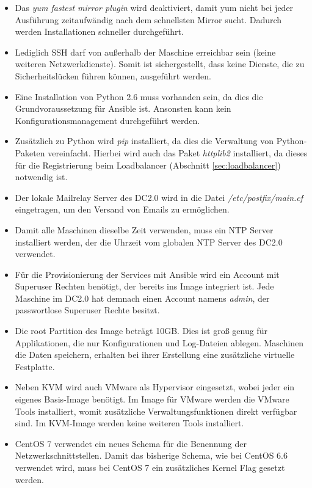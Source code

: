 \begin{itemize}
	\item Das \textit{yum fastest mirror plugin} wird deaktiviert, damit yum nicht bei jeder Ausführung zeitaufwändig nach dem schnellsten Mirror sucht. Dadurch werden Installationen schneller durchgeführt.
	\item Lediglich SSH darf von außerhalb der Maschine erreichbar sein (keine weiteren Netzwerkdienste). Somit ist sichergestellt, dass keine Dienste, die zu Sicherheitslücken führen können, ausgeführt werden.
	\item Eine Installation von Python 2.6 muss vorhanden sein, da dies die Grundvoraussetzung für Ansible ist. Ansonsten kann kein Konfigurationsmanagement durchgeführt werden.
	\item Zusätzlich zu Python wird \textit{pip} installiert, da dies die Verwaltung von Python-Paketen vereinfacht. Hierbei wird auch das Paket \textit{httplib2} installiert, da dieses für die Registrierung beim Loadbalancer (Abschnitt \ref{sec:loadbalancer}) notwendig ist.
	\item Der lokale Mailrelay Server des DC2.0 wird in die Datei \textit{/etc/postfix/main.cf} eingetragen, um den Versand von Emails zu ermöglichen.
	\item Damit alle Maschinen dieselbe Zeit verwenden, muss ein NTP Server installiert werden, der die Uhrzeit vom globalen NTP Server des DC2.0 verwendet.
	\item Für die Provisionierung der Services mit Ansible wird ein Account mit Superuser Rechten benötigt, der bereits ins Image integriert ist. Jede Maschine im DC2.0 hat demnach einen Account namens \textit{admin}, der passwortlose Superuser Rechte besitzt.
	\item Die root Partition des Image beträgt 10GB. Dies ist groß genug für Applikationen, die nur Konfigurationen und Log-Dateien ablegen. Maschinen die Daten speichern, erhalten bei ihrer Erstellung eine zusätzliche virtuelle Festplatte.
	\item Neben KVM wird auch VMware als Hypervisor eingesetzt, wobei jeder ein eigenes Basis-Image benötigt. Im Image für VMware werden die VMware Tools installiert, womit zusätzliche Verwaltungsfunktionen direkt verfügbar sind. Im KVM-Image werden keine weiteren Tools installiert.
	\item CentOS 7 verwendet ein neues Schema für die Benennung der Netzwerkschnittstellen. Damit das bisherige Schema, wie bei CentOS 6.6 verwendet wird, muss bei CentOS 7 ein zusätzliches Kernel Flag gesetzt werden. 
\end{itemize}

